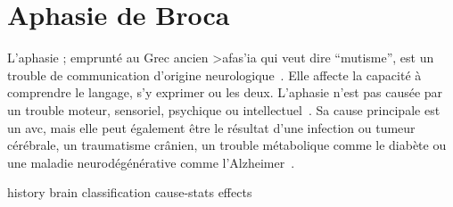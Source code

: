 \section{Aphasie de Broca}

L'aphasie ; emprunté au Grec ancien \textgreek{>afas'ia} qui veut dire ``mutisme'',
est un trouble de communication d'origine neurologique~\cite{Larousse}. 
Elle affecte la capacité à comprendre le langage, s'y exprimer ou les deux.
L'aphasie n'est pas causée par un trouble moteur, sensoriel, psychique ou intellectuel~\cite{Chapey_2008}.
Sa cause principale est un \gls{avc}, 
mais elle peut également être le résultat d'une infection ou tumeur cérébrale, 
un traumatisme crânien, un trouble métabolique comme le diabète 
ou une maladie neurodégénérative comme l'Alzheimer~\cite{Hallowell_2017}.

{history}
{brain}
{classification}
{cause-stats}
{effects}